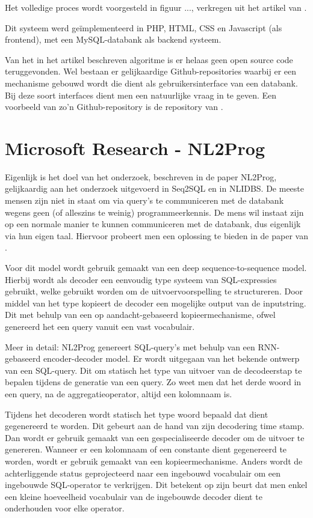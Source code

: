 Het volledige proces wordt voorgesteld in figuur ..., verkregen uit het artikel van \textcite{nlidbs}.

Dit systeem werd geïmplementeerd in PHP, HTML, CSS en Javascript (als frontend), met een MySQL-databank als backend systeem.

Van het in het artikel beschreven algoritme is er helaas geen open source code teruggevonden. Wel bestaan er gelijkaardige Github-repositories waarbij er een mechanisme gebouwd wordt die dient als gebruikersinterface van een databank. Bij deze soort interfaces dient men een natuurlijke vraag in te geven. Een voorbeeld van zo'n Github-repository is de repository van \textcite{nlidb}.

\section{Microsoft Research - NL2Prog}

Eigenlijk is het doel van het onderzoek, beschreven in de paper NL2Prog, gelijkaardig aan het onderzoek uitgevoerd in Seq2SQL en in NLIDBS. De meeste mensen zijn niet in staat om via query's te communiceren met de databank wegens geen (of alleszins te weinig) programmeerkennis. De mens wil instaat zijn op een normale manier te kunnen communiceren met de databank, dus eigenlijk via hun eigen taal. Hiervoor probeert men een oplossing te bieden in de paper van \textcite{nl2prog}.		

Voor dit model wordt gebruik gemaakt van een deep sequence-to-sequence model. Hierbij wordt als decoder een eenvoudig type systeem van SQL-expressies gebruikt, welke gebruikt worden om de uitvoervoorspelling te structureren. Door middel van het type kopieert de decoder een mogelijke output van de inputstring. Dit met behulp van een op aandacht-gebaseerd kopieermechanisme, ofwel genereerd het een query vanuit een vast vocabulair.

Meer in detail: NL2Prog genereert SQL-query’s met behulp van een RNN-gebaseerd encoder-decoder model. Er wordt uitgegaan van het bekende ontwerp van een SQL-query. Dit om statisch het type van uitvoer van de decodeerstap te bepalen tijdens de generatie van een query. Zo weet men dat het derde woord in een query, na de aggregatieoperator, altijd een kolomnaam is. 

Tijdens het decoderen wordt statisch het type woord bepaald dat dient gegenereerd te worden. Dit gebeurt aan de hand van zijn decodering time stamp. Dan wordt er gebruik gemaakt van een gespecialiseerde decoder om de uitvoer te genereren. Wanneer er een kolomnaam of een constante dient gegenereerd te worden, wordt er gebruik gemaakt van een kopieermechanisme. Anders wordt de achterliggende status geprojecteerd naar een ingebouwd vocabulair om een ingebouwde SQL-operator te verkrijgen. Dit betekent op zijn beurt dat men enkel een kleine hoeveelheid vocabulair van de ingebouwde decoder dient te onderhouden voor elke operator.

